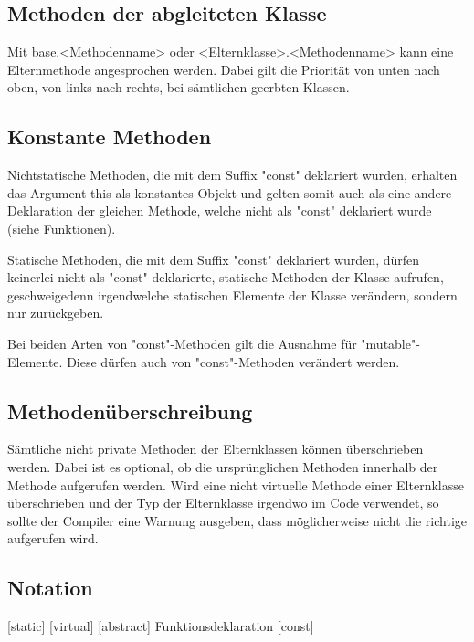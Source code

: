 \subsection{Methoden der abgleiteten Klasse}
Mit base.<Methodenname> oder <Elternklasse>.<Methodenname> kann eine Elternmethode angesprochen werden.
Dabei gilt die Priorität von unten nach oben, von links nach rechts, bei sämtlichen geerbten Klassen.

\subsection{Konstante Methoden}
Nichtstatische Methoden, die mit dem Suffix "const" deklariert wurden, erhalten das Argument this als konstantes Objekt
und gelten somit auch als eine andere Deklaration der gleichen Methode, welche nicht als "const"
deklariert wurde (siehe Funktionen).

Statische Methoden, die mit dem Suffix "const" deklariert wurden, dürfen keinerlei nicht als "const" deklarierte, statische
Methoden der Klasse aufrufen, geschweigedenn irgendwelche statischen Elemente der Klasse verändern, sondern nur zurückgeben.

Bei beiden Arten von "const"-Methoden gilt die Ausnahme für "mutable"-Elemente.
Diese dürfen auch von "const"-Methoden verändert werden.

\subsection{Methodenüberschreibung}
Sämtliche nicht private Methoden der Elternklassen können überschrieben werden. Dabei ist es optional, ob die ursprünglichen Methoden innerhalb
der Methode aufgerufen werden.
Wird eine nicht virtuelle Methode einer Elternklasse überschrieben und der Typ der Elternklasse irgendwo im Code verwendet, so sollte
der Compiler eine Warnung ausgeben, dass möglicherweise nicht die richtige aufgerufen wird.

\subsection{Notation}
[static] [virtual] [abstract] Funktionsdeklaration [const]

